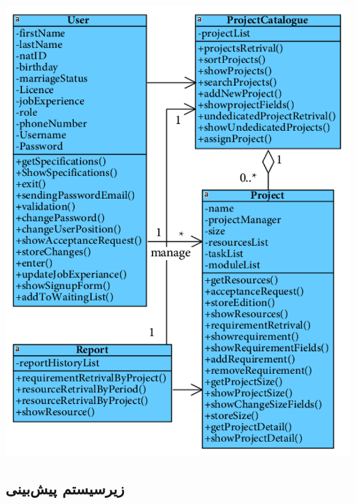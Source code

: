 \newpage
\vspace{2cm}
\begin{center}
\includegraphics[width=\textwidth]{SequenceClasses/42.png}
\end{center}


\newpage
\subsection{زیرسیستم پیش‌بینی}

\vspace{2cm}
